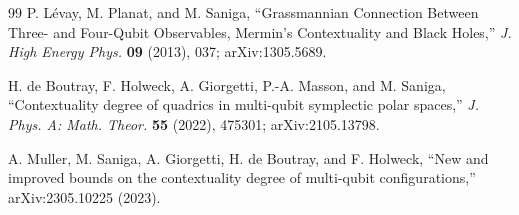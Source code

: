 \documentclass[11pt,a4paper]{article}
\theoremstyle{remark}
\begin{document}
\begin{thebibliography}{99}
P. L\'evay, M. Planat, and M. Saniga,
``Grassmannian Connection Between Three- and Four-Qubit Observables,
Mermin's Contextuality and Black Holes,''
\textit{J. High Energy Phys.} \textbf{09} (2013), 037;
arXiv:1305.5689.

H. de Boutray, F. Holweck, A. Giorgetti, P.-A. Masson, and M. Saniga,
``Contextuality degree of quadrics in multi-qubit symplectic polar spaces,''
\textit{J. Phys. A: Math. Theor.} \textbf{55} (2022), 475301;
arXiv:2105.13798.

A. Muller, M. Saniga, A. Giorgetti, H. de Boutray, and F. Holweck,
``New and improved bounds on the contextuality degree of multi-qubit configurations,''
arXiv:2305.10225 (2023).

\end{thebibliography}
\end{document}
